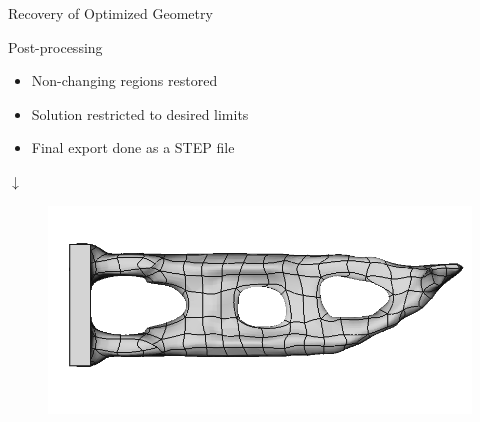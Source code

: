 \begin{frame}{Recovery of Optimized Geometry}
	\begin{minipage}[t]{0.5\linewidth}
	\vspace{-0.5cm}
		\begin{block}{Post-processing}
			\begin{itemize}
				\item Non-changing regions restored \\
				\item Solution restricted to desired limits \\
				\item Final export done as a STEP file
			\end{itemize}
		\end{block}
	\end{minipage}
	\hfill%
	\begin{minipage}[t]{0.45\linewidth}

		\vspace{0.2cm}
		\begin{center}
			$\downarrow$
		\end{center}
		\vspace{-0.6cm}
		\begin{figure}
			\includegraphics[width=.88\textwidth]{Pictures/SecondHalf/Back2CAD3}
		\end{figure}
	\end{minipage}
\end{frame}
